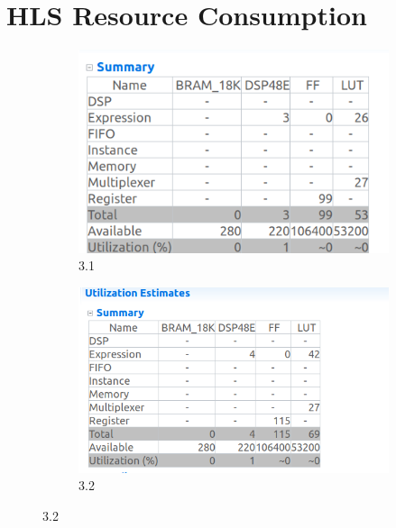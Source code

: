 \documentclass{article}
\begin{document}
\section{HLS Resource Consumption}
\vspace{1cm}
\begin{figure}[h]
\centering
\begin{subfigure}[b]{0.8\textwidth}
    \centering
\includegraphics[width=\textwidth]{figs/31a.png}
    \caption{3.1}
    \label{fig:my_label}
\end{subfigure}
\hfill
\begin{subfigure}[b]{0.8\textwidth}
    \centering
\includegraphics[width=\textwidth]{figs/31b.png}
    \caption{3.2}
    \label{fig:my_label}
\end{subfigure}
\end{figure}

\vspace{5cm}
\end{document}
